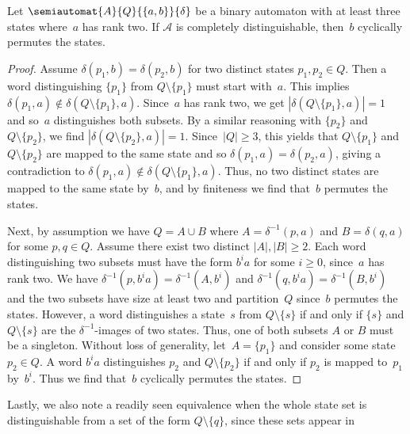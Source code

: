 \begin{proposition} \label{syncmax:prop:binary-rank-two-letter}
	Let $\semiautomat{A}{Q}{\{a,b\}}{\delta}$ be a binary automaton with at least three states
	where~$a$ has rank two.
	If $\mathcal A$ is completely distinguishable,
	then~$b$ cyclically permutes the states.
\end{proposition}
\begin{proof}
	Assume $\delta(p_1, b) = \delta(p_2, b)$
	for two distinct states $p_1, p_2 \in Q$.
	Then a word distinguishing $\{p_1\}$ from $Q \setminus\{p_1\}$
	must start with~$a$.
	This implies $\delta(p_1, a) \notin \delta(Q \setminus \{p_1\}, a)$.
	Since~$a$ has rank two,
	we get $|\delta(Q \setminus \{p_1\}, a)| = 1$
	and so~$a$ distinguishes both subsets.
	By a similar reasoning with $\{p_2\}$ and $Q \setminus \{p_2\}$,
	we find $|\delta(Q \setminus \{p_2\}, a)| = 1$.
	Since~$|Q| \ge 3$,
	this yields that $Q \setminus \{p_1\}$
	and $Q \setminus \{p_2\}$ are mapped to the same
	state and so $\delta(p_1, a) = \delta(p_2, a)$,
	giving a contradiction
	to $\delta(p_1, a) \notin \delta(Q \setminus \{p_1\}, a)$.
	Thus, no two distinct states are mapped
	to the same state by~$b$,
	and by finiteness we find that~$b$
	permutes the states.
	
	Next, by assumption we have $Q = A \cup B$
	where $A = \delta^{-1}(p, a)$
	and $B = \delta(q, a)$ for some $p,q \in Q$.
	Assume there exist two distinct $|A|, |B| \ge 2$.
	Each word distinguishing two subsets
	must have the form $b^ia$ for some $i \ge 0$,
	since~$a$ has rank two.
	We have $\delta^{-1}(p, b^ia) = \delta^{-1}(A, b^i)$
	and $\delta^{-1}(q, b^ia) = \delta^{-1}(B, b^i)$
	and the two subsets have size at least two
	and partition~$Q$ since~$b$ permutes the states.
	However, a word distinguishes a state~$s$
	from $Q \setminus \{s\}$
	if and only if $\{s\}$
	and $Q \setminus \{s\}$
	are the $\delta^{-1}$-images of two states.
	Thus, one of both subsets $A$ or $B$
	must be a singleton.
	Without loss of generality, let~$A = \{p_1\}$ and consider some state $p_2 \in Q$.
	A word $b^ia$ distinguishes $p_2$ and $Q \setminus \{p_2\}$
	if and only if $p_2$ is mapped to~$p_1$
	by~$b^i$. Thus we find that~$b$ cyclically permutes the states.	
\end{proof}

Lastly, we also note a readily seen equivalence when the whole state set is distinguishable
from a set of the form $Q \setminus\{q\}$, since these sets appear in 

